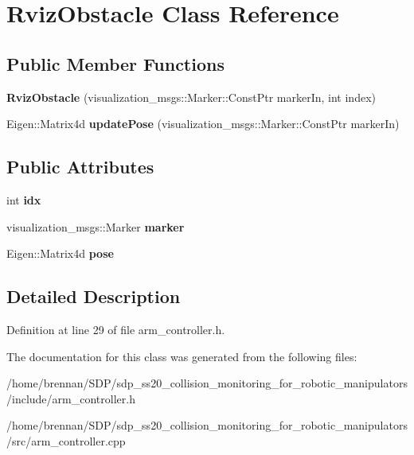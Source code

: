\hypertarget{class_rviz_obstacle}{}\section{Rviz\+Obstacle Class Reference}
\label{class_rviz_obstacle}
\subsection*{Public Member Functions}
\begin{DoxyCompactItemize}
\item 
{\bfseries Rviz\+Obstacle} (visualization\+\_\+msgs\+::\+Marker\+::\+Const\+Ptr marker\+In, int index)\hypertarget{class_rviz_obstacle_a3fb19f60434581b669c0dc063c026943}{}\label{class_rviz_obstacle_a3fb19f60434581b669c0dc063c026943}

\item 
Eigen\+::\+Matrix4d {\bfseries update\+Pose} (visualization\+\_\+msgs\+::\+Marker\+::\+Const\+Ptr marker\+In)\hypertarget{class_rviz_obstacle_a30101e2a3c65776bb4abbb139f10b14a}{}\label{class_rviz_obstacle_a30101e2a3c65776bb4abbb139f10b14a}

\end{DoxyCompactItemize}
\subsection*{Public Attributes}
\begin{DoxyCompactItemize}
\item 
int {\bfseries idx}\hypertarget{class_rviz_obstacle_aac6f99fde043e8d9c0e9d0bab32fd375}{}\label{class_rviz_obstacle_aac6f99fde043e8d9c0e9d0bab32fd375}

\item 
visualization\+\_\+msgs\+::\+Marker {\bfseries marker}\hypertarget{class_rviz_obstacle_a9edb18553236c56fb49e9d181e0ed052}{}\label{class_rviz_obstacle_a9edb18553236c56fb49e9d181e0ed052}

\item 
Eigen\+::\+Matrix4d {\bfseries pose}\hypertarget{class_rviz_obstacle_aa48c4d1a26938cb932aac1439373b60b}{}\label{class_rviz_obstacle_aa48c4d1a26938cb932aac1439373b60b}

\end{DoxyCompactItemize}


\subsection{Detailed Description}


Definition at line 29 of file arm\+\_\+controller.\+h.



The documentation for this class was generated from the following files\+:\begin{DoxyCompactItemize}
\item 
/home/brennan/\+S\+D\+P/sdp\+\_\+ss20\+\_\+collision\+\_\+monitoring\+\_\+for\+\_\+robotic\+\_\+manipulators/include/arm\+\_\+controller.\+h\item 
/home/brennan/\+S\+D\+P/sdp\+\_\+ss20\+\_\+collision\+\_\+monitoring\+\_\+for\+\_\+robotic\+\_\+manipulators/src/arm\+\_\+controller.\+cpp\end{DoxyCompactItemize}
